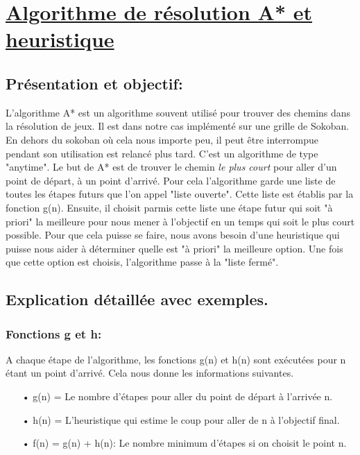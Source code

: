 \documentclass{article}
\begin{document}
\newpage

\section{\underline{ Algorithme de résolution A* et heuristique}}
	
\vspace{1.5 cm}


\subsection{Présentation et objectif:}
L'algorithme A* est un algorithme souvent utilisé pour trouver des chemins dans la résolution de jeux. Il est dans notre cas implémenté sur une grille de Sokoban. En dehors du sokoban où cela nous importe peu, il peut être interrompue pendant son utilisation est relancé plus tard. C'est un algorithme de type "anytime".
Le but de A* est de trouver le chemin \textit{le plus court} pour aller d'un point de départ, à un point d'arrivé. Pour cela l'algorithme garde une liste de toutes les étapes futurs que l'on appel "liste ouverte". Cette liste est établis par la fonction g(n). Ensuite, il choisit parmis cette liste une étape futur qui soit "à priori" la meilleure pour nous mener à l'objectif en un temps qui soit le plus court possible. Pour que cela puisse se faire, nous avons besoin d'une heuristique qui puisse nous aider à déterminer quelle est "à priori" la meilleure option. Une fois que cette option est choisis, l'algorithme passe à la "liste fermé". 
\subsection{Explication détaillée avec exemples.}
\subsubsection{Fonctions g et h:}
A chaque étape de l'algorithme, les fonctions g(n) et h(n) sont exécutées pour n étant un point d'arrivé. Cela nous donne les informations suivantes.
\begin{itemize}
\item[• g(n) = Le nombre d'étapes pour aller du point de départ à l'arrivée n.]
\item[• h(n) = L'heuristique qui estime le coup pour aller de n à l'objectif final.]
\item[• f(n) = g(n) + h(n): Le nombre minimum d'étapes si on choisit le point n.]
\end{itemize}
\end{document}
